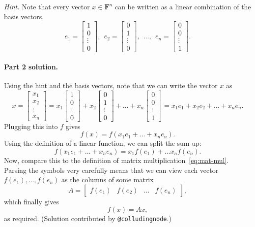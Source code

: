 \documentclass[12pt,hidelinks]{article}
\newcommand{\field}{\mathbf{F}}
\begin{document}
\emph{Hint.} Note that every vector $x \in \field^n$ can be written
as a linear combination of the basis vectors,
\[
    e_1 = \begin{bmatrix}
        1\\0\\\vdots\\0
    \end{bmatrix},
    ~~
    e_2 = 
    \begin{bmatrix}
        0\\1\\\vdots\\0
    \end{bmatrix},
    ~~
    \dots,
    ~~
    e_n = 
    \begin{bmatrix}
        0\\0\\\vdots\\1
    \end{bmatrix}.
\]

\begin{solution}
\paragraph{Part 2 solution.} 
Using the hint and the basis vectors, note that we can write the vector $x$ as
\[
    x = \begin{bmatrix}
    x_1 \\ x_2 \\ \vdots \\ x_n
    \end{bmatrix} = x_1\begin{bmatrix}
    1 \\ 0 \\ \vdots \\ 0
    \end{bmatrix} + x_2\begin{bmatrix}
    0 \\ 1 \\ \vdots \\ 0
    \end{bmatrix} + \dots + x_n\begin{bmatrix}
    0 \\ 0 \\ \vdots \\ 1
    \end{bmatrix} = x_1e_1 + x_2e_2 + \dots + x_n e_n.
\]
Plugging this into $f$ gives
\[
    f(x) = f(x_1 e_1 + \dots + x_n e_n).
\]
Using the definition of a linear function, we can split the sum up:
\[
f(x_1 e_1 + \dots + x_n e_n) = x_1f(e_1) + \dots x_n f(e_n).
\]
Now, compare this to the definition of matrix multiplication~\eqref{eq:mat-mul}.
Parsing the symbols very carefully means that we can view each vector
$f(e_1), \dots, f(e_n)$ as the columns of some matrix
\[
    A = \begin{bmatrix} f(e_1) & f(e_2) & \dots & f(e_n) \end{bmatrix},
\]
which finally gives
\[
    f(x) = Ax,
\]
as required. (Solution contributed by \verb|@colludingnode|.)
\end{solution}
\end{document}
